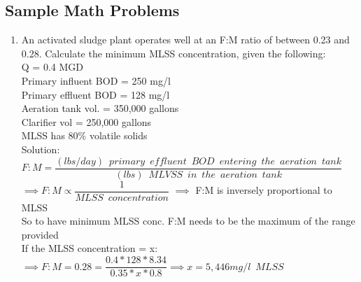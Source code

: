 \subsection{Sample Math Problems}

\begin{enumerate}

\item An activated sludge plant operates well at an F:M ratio of between 0.23 and 0.28.  Calculate the minimum MLSS concentration, given the following:\\
Q = 0.4 MGD\\
Primary influent BOD = 250 mg/l\\
Primary effluent BOD = 128 mg/l\\
Aeration tank vol. = 350,000 gallons\\
Clarifier vol = 250,000 gallons\\
MLSS has 80\% volatile solids\\
\vspace{0.3cm}
Solution:\\
\vspace{0.3cm}
$F:M=\dfrac{(lbs/day) \enspace primary \enspace effluent  \enspace BOD \enspace entering \enspace the  \enspace aeration \enspace tank}{(lbs) \enspace MLVSS \enspace in \enspace the  \enspace aeration \enspace tank}$\\
\vspace{0.3cm}
$\implies F:M \propto \dfrac{1}{MLSS \enspace concentration}$  $\implies$ F:M is inversely proportional to MLSS\\
\vspace{0.3cm}
So to have minimum MLSS conc. F:M needs to be the maximum of the range provided\\
\vspace{0.3cm}
If the MLSS concentration = x:
$ \implies F:M=0.28=\dfrac{0.4*128*8.34}{0.35*x*0.8}\implies x = \boxed{5,446 mg/l \enspace MLSS}$


\newpage


\end{enumerate}
